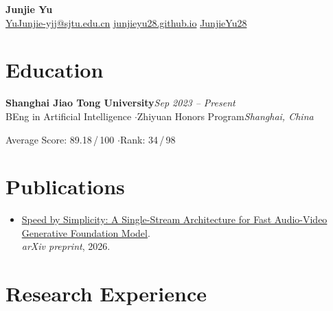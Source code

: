 \documentclass[11pt,a4paper]{article}
\newcommand{\entry}[4]{%
  \textbf{#1}\hfill{\color{muted}\textit{#2}}\\[-1pt]
  {\color{muted}#3}\hfill{\color{muted}\textit{#4}}\par\vspace{1pt}%
}
\begin{document}
\begin{center}
  {\fontsize{22}{26}\selectfont\bfseries\color{accent} Junjie Yu}\\[6pt]
  {\small\color{muted}%
    \faEnvelope\enspace\href{mailto:YuJunjie-yjj@sjtu.edu.cn}{YuJunjie-yjj@sjtu.edu.cn}%
    \enspace{\color{rulecolor}\textbar}\enspace%
    \faGlobe\enspace\href{https://junjieyu28.github.io}{junjieyu28.github.io}%
    \enspace{\color{rulecolor}\textbar}\enspace%
    \faGithub\enspace\href{https://github.com/JunjieYu28}{JunjieYu28}%
  }
\end{center}

\vspace{-2pt}

\section{Education}

\entry{Shanghai Jiao Tong University}{Sep 2023 -- Present}
{BEng in Artificial Intelligence \enspace$\cdot$\enspace Zhiyuan Honors Program}{Shanghai, China}
{\small Average Score: 89.18\,/\,100 \enspace$\cdot$\enspace Rank: 34\,/\,98}

\section{Publications}

\begin{itemize}
  \item \href{https://arxiv.org/abs/2603.21986}{Speed by Simplicity: A Single-Stream Architecture for Fast Audio-Video Generative Foundation Model}.\\ \textit{arXiv preprint}, 2026.
\end{itemize}

\section{Research Experience}
\end{document}

